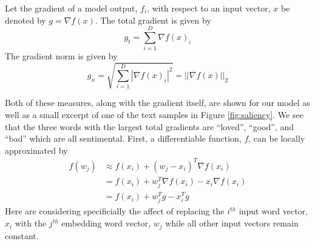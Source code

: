 \noindent
\begin{definition}
Let the gradient of a model output, $f_i$, with respect to an input vector, $x$ be denoted by $g=\nabla f(x)$.  The total gradient is given by 
\begin{equation}
g_t = \sum_{i=1}^D \nabla f(x)_i
\end{equation}
The gradient norm is given by 
\begin{equation}
g_n = \sqrt{\sum_{i=1}^D |\nabla f(x)_i|^2} = ||\nabla f(x)||_2
\end{equation}
\end{definition}

Both of these measures, along with the gradient itself, are shown for our model as well as a small excerpt of one of the text samples in Figure \ref{fig:saliency}.  We see that the three words with the largest total gradients are ``loved'', ``good'', and ``bad'' which are all sentimental.  First, a differentiable function, $f$, can be locally approximated by
\begin{align}
f(w_j) &\approx f(x_i) + (w_j-x_i)^T\nabla f(x_i) \\
     &= f(x_i) + w_j^T\nabla f(x_i) - x_i\nabla f(x_i) \\
     &= f(x_i) + w_j^Tg - x_i^Tg \label{approx}
\end{align}
Here are considering specificially the affect of replacing the $i^{th}$ input word vector, $x_i$ with the $j^{th}$ embedding word vector, $w_j$ while all other input vectors remain constant.

